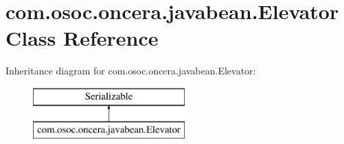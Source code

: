 \hypertarget{classcom_1_1osoc_1_1oncera_1_1javabean_1_1_elevator}{}\section{com.\+osoc.\+oncera.\+javabean.\+Elevator Class Reference}
\label{classcom_1_1osoc_1_1oncera_1_1javabean_1_1_elevator}
Inheritance diagram for com.\+osoc.\+oncera.\+javabean.\+Elevator\+:\begin{figure}[H]
\begin{center}
\leavevmode
\includegraphics[height=2.000000cm]{classcom_1_1osoc_1_1oncera_1_1javabean_1_1_elevator}
\end{center}
\end{figure}
